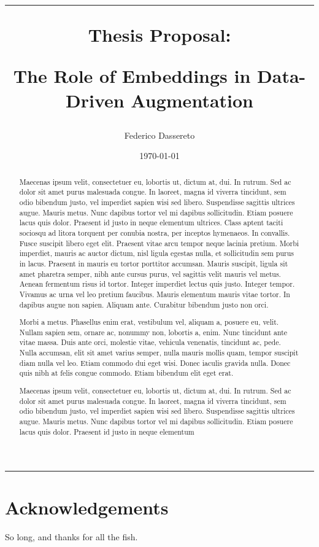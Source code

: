 \documentclass[a4paper,11pt, english]{article}
\title{\vspace{0cm}
\hrule
\vspace{1cm}
\centerline{\LARGE{Thesis Proposal:}}
\vspace{0.5cm}
\centerline{\LARGE {\bf The Role of Embeddings in Data-Driven Augmentation}}
}
\author{Federico Dassereto}
\date{\today}
\begin{document}
\maketitle
\hrule 
\vspace{1cm}

\begin{abstract}
    Maecenas ipsum velit, consectetuer eu, lobortis ut, dictum at, dui. In rutrum. Sed ac dolor sit amet purus malesuada congue. In laoreet, magna id viverra tincidunt, sem odio bibendum justo, vel imperdiet sapien wisi sed libero. Suspendisse sagittis ultrices augue. Mauris metus. Nunc dapibus tortor vel mi dapibus sollicitudin. Etiam posuere lacus quis dolor. Praesent id justo in neque elementum ultrices. Class aptent taciti sociosqu ad litora torquent per conubia nostra, per inceptos hymenaeos. In convallis. Fusce suscipit libero eget elit. Praesent vitae arcu tempor neque lacinia pretium. Morbi imperdiet, mauris ac auctor dictum, nisl ligula egestas nulla, et sollicitudin sem purus in lacus. Praesent in mauris eu tortor porttitor accumsan. Mauris suscipit, ligula sit amet pharetra semper, nibh ante cursus purus, vel sagittis velit mauris vel metus. Aenean fermentum risus id tortor. Integer imperdiet lectus quis justo. Integer tempor. Vivamus ac urna vel leo pretium faucibus. Mauris elementum mauris vitae tortor. In dapibus augue non sapien. Aliquam ante. Curabitur bibendum justo non orci.

 Morbi a metus. Phasellus enim erat, vestibulum vel, aliquam a, posuere eu, velit. Nullam sapien sem, ornare ac, nonummy non, lobortis a, enim. Nunc tincidunt ante vitae massa. Duis ante orci, molestie vitae, vehicula venenatis, tincidunt ac, pede. Nulla accumsan, elit sit amet varius semper, nulla mauris mollis quam, tempor suscipit diam nulla vel leo. Etiam commodo dui eget wisi. Donec iaculis gravida nulla. Donec quis nibh at felis congue commodo. Etiam bibendum elit eget erat.

 Maecenas ipsum velit, consectetuer eu, lobortis ut, dictum at, dui. In rutrum. Sed ac dolor sit amet purus malesuada congue. In laoreet, magna id viverra tincidunt, sem odio bibendum justo, vel imperdiet sapien wisi sed libero. Suspendisse sagittis ultrices augue. Mauris metus. Nunc dapibus tortor vel mi dapibus sollicitudin. Etiam posuere lacus quis dolor. Praesent id justo in neque elementum
\end{abstract}











\section*{Acknowledgements}{So long, and thanks for all the fish.}



\printbibliography
\end{document}
